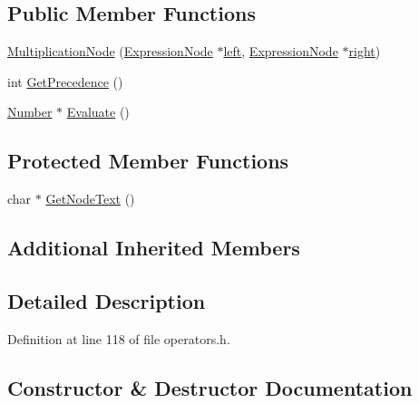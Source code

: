 \subsection*{Public Member Functions}
\begin{DoxyCompactItemize}
\item 
\hyperlink{classMultiplicationNode_a3f96a30f283caa7991dd67be334e71af}{Multiplication\+Node} (\hyperlink{classExpressionNode}{Expression\+Node} $\ast$\hyperlink{classNumericOperator_a55da3c4075408deff978711030fa8258}{left}, \hyperlink{classExpressionNode}{Expression\+Node} $\ast$\hyperlink{classNumericOperator_aa2c5b5bea59bbb068bc6013bc5cac483}{right})
\item 
int \hyperlink{classMultiplicationNode_ac4b9d0e5f279a0a2d2b51a2872c298df}{Get\+Precedence} ()
\item 
\hyperlink{structNumber}{Number} $\ast$ \hyperlink{classMultiplicationNode_a6f8b2f1b4a4779fd99acc6cef50545cc}{Evaluate} ()
\end{DoxyCompactItemize}
\subsection*{Protected Member Functions}
\begin{DoxyCompactItemize}
\item 
char $\ast$ \hyperlink{classMultiplicationNode_a27cfb5744a3f963fa59e9b79d6c14499}{Get\+Node\+Text} ()
\end{DoxyCompactItemize}
\subsection*{Additional Inherited Members}


\subsection{Detailed Description}


Definition at line 118 of file operators.\+h.



\subsection{Constructor \& Destructor Documentation}
